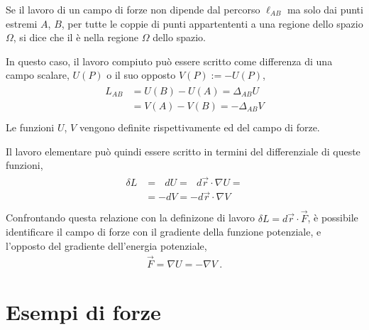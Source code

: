 \documentclass[letterpaper,10pt,italian]{jupyterBook}
\begin{document}
\sphinxAtStartPar
Se il lavoro di un campo di forze non dipende dal percorso \(\ell_{AB}\) ma solo dai punti estremi \(A\), \(B\), per tutte le coppie di punti appartententi a una regione dello spazio \(\Omega\), si dice che il  è  nella regione \(\Omega\) dello spazio.

\sphinxAtStartPar
In questo caso, il lavoro compiuto può essere scritto come differenza di una campo scalare, \(U(P)\) o il suo opposto \(V(P) := - U(P)\),
\begin{equation*}
\begin{split}\begin{aligned}
  L_{AB} &  = U(B) - U(A) = \Delta_{AB} U  \\
         &  = V(A) - V(B) =-\Delta_{AB} V  \\
\end{aligned}\end{split}
\end{equation*}
\sphinxAtStartPar
Le funzioni \(U\), \(V\) vengono definite rispettivamente  ed  del campo di forze.

\sphinxAtStartPar
Il lavoro elementare può quindi essere scritto in termini del differenziale di queste funzioni,
\begin{equation*}
\begin{split}\begin{aligned}
  \delta L & = \ \ \ d U =\ \ \ d \vec{r} \cdot \nabla U  = \\
           & =     - d V =    - d \vec{r} \cdot \nabla V \\
\end{aligned}\end{split}
\end{equation*}
\sphinxAtStartPar
Confrontando questa relazione con la definizone di lavoro \(\delta L = d \vec{r} \cdot \vec{F}\), è possibile identificare il campo di forze con il gradiente della funzione potenziale, e l’opposto del gradiente dell’energia potenziale,
\begin{equation*}
\begin{split}\vec{F} = \nabla U = - \nabla V \ .\end{split}
\end{equation*}
\sphinxstepscope




\section{Esempi di forze}
\label{\detokenize{ch/mechanics/actions-examples:esempi-di-forze}}\label{\detokenize{ch/mechanics/actions-examples:physics-hs-mechanics-actions-examples}}\label{\detokenize{ch/mechanics/actions-examples::doc}}
\end{document}
